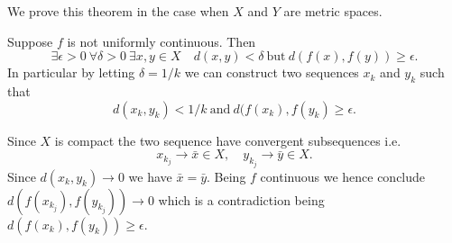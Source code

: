 \documentclass[12pt]{article}
\begin{document}
We prove this theorem in the case when $X$ and $Y$ are metric spaces.

Suppose $f$ is not uniformly continuous. Then
\[
  \exists \epsilon>0\ \forall \delta>0\ \exists x,y\in X \quad
  d(x,y)< \delta \ \mathrm{but}\ d(f(x),f(y))\ge \epsilon.
\]
In particular by letting $\delta=1/k$ we can construct two sequences $x_k$ and $y_k$ such that
\[
  d(x_k,y_k) < 1/k\ \mathrm{and}\ d(f(x_k),f(y_k)\ge \epsilon.
\]

Since $X$ is compact the two sequence have convergent subsequences i.e. 
\[
  x_{k_j} \to \bar x \in X, \quad y_{k_j} \to \bar y \in X.
\]
Since $d(x_k,y_k)\to 0$ we have $\bar x = \bar y$. Being $f$ continuous we hence conclude $d(f(x_{k_j}),f(y_{k_j})) \to 0$ which is a contradiction being $d(f(x_k),f(y_k))\ge \epsilon$.
\end{document}
